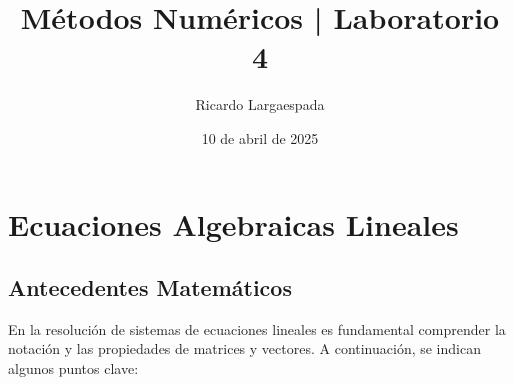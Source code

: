 \documentclass[12pt,letterpaper]{article}
\author{Ricardo Largaespada}
\title{\textbf{Métodos Numéricos | Laboratorio 4}}
\date{10 de abril de 2025}
\theoremstyle{definition}
\theoremstyle{plain}
\theoremstyle{remark}
\begin{document}
\maketitle


\section{Ecuaciones Algebraicas Lineales}

\subsection{Antecedentes Matemáticos}

En la resolución de sistemas de ecuaciones lineales es fundamental comprender la notación y las propiedades de matrices y vectores. A continuación, se indican algunos puntos clave:
\end{document}
